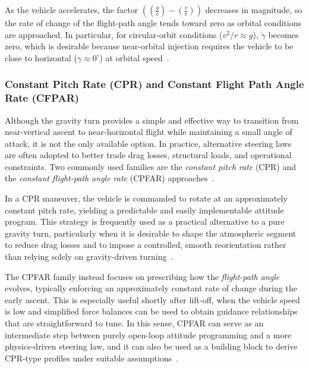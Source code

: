 As the vehicle accelerates, the factor $\left((\frac{g}{v})-(\frac{v}{r})\right)$ decreases in magnitude, so the rate of change of the flight-path angle tends toward zero as orbital conditions are approached. In particular, for circular-orbit conditions ($v^2/r \approx g$), $\dot{\gamma}$ becomes zero, which is desirable because near-orbital injection requires the vehicle to be close to horizontal ($\gamma \approx 0^\circ$) at orbital speed~\cite{Edberg}.


\subsubsection{Constant Pitch Rate (CPR) and Constant Flight Path Angle Rate (CFPAR)}

Although the gravity turn provides a simple and effective way to transition from near-vertical ascent to near-horizontal flight while maintaining a small angle of attack, it is not the only available option. In practice, alternative steering laws are often adopted to better trade drag losses, structural loads, and operational constraints. Two commonly used families are the \emph{constant pitch rate} (CPR) and the \emph{constant flight-path angle rate} (CPFAR) approaches~\cite{Ulrich}.

In a CPR maneuver, the vehicle is commanded to rotate at an approximately constant pitch rate, yielding a predictable and easily implementable attitude program. This strategy is frequently used as a practical alternative to a pure gravity turn, particularly when it is desirable to shape the atmospheric segment to reduce drag losses and to impose a controlled, smooth reorientation rather than relying solely on gravity-driven turning~\cite{Ulrich}.

The CPFAR family instead focuses on prescribing how the \emph{flight-path angle} evolves, typically enforcing an approximately constant rate of change during the early ascent. This is especially useful shortly after lift-off, when the vehicle speed is low and simplified force balances can be used to obtain guidance relationships that are straightforward to tune. In this sense, CPFAR can serve as an intermediate step between purely open-loop attitude programming and a more physics-driven steering law, and it can also be used as a building block to derive CPR-type profiles under suitable assumptions~\cite{Ulrich}.


